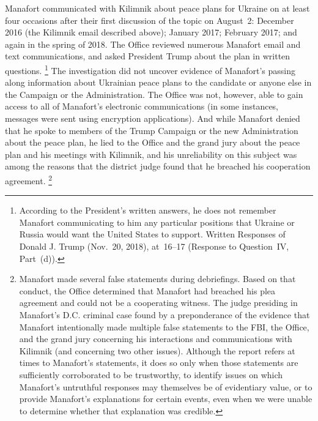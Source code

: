 Manafort communicated with Kilimnik about peace plans for Ukraine on at least four occasions after their first discussion of the topic on August~2: December 2016 (the Kilimnik email described above); January 2017; February 2017; and again in the spring of 2018.
The Office reviewed numerous Manafort email and text communications, and asked President Trump about the plan in written questions.%
\footnote{According to the President's written answers, he does not remember Manafort communicating to him any particular positions that Ukraine or Russia would want the United States to support.
Written Responses of Donald J. Trump (Nov.~20, 2018), at~16--17 (Response to Question~IV, Part~(d)).}
The investigation did not uncover evidence of Manafort's passing along information about Ukrainian peace plans to the candidate or anyone else in the Campaign or the Administration.
The Office was not, however, able to gain access to all of Manafort's electronic communications (in some instances, messages were sent using encryption applications).
And while Manafort denied that he spoke to members of the Trump Campaign or the new Administration about the peace plan, he lied to the Office and the grand jury about the peace plan and his meetings with Kilimnik, and his unreliability on this subject was among the reasons that the district judge found that he breached his cooperation agreement.%
\footnote{Manafort made several false statements during debriefings. Based on that conduct, the Office determined that Manafort had breached his plea agreement and could not be a cooperating witness. The judge presiding in Manafort's D.C. criminal case found by a preponderance of the evidence that Manafort intentionally made multiple false statements to the FBI, the Office, and the grand jury concerning his interactions and communications with Kilimnik (and concerning two other issues). Although the report refers at times to Manafort's statements, it does so only when those statements are sufficiently corroborated to be trustworthy, to identify issues on which Manafort's untruthful responses may themselves be of evidentiary value, or to provide Manafort's explanations for certain events, even when we were unable to determine whether that explanation was credible.}

